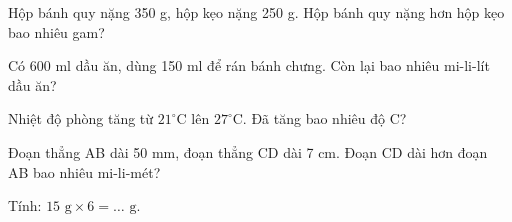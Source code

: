 \begin{ex}
Hộp bánh quy nặng 350 g, hộp kẹo nặng 250 g. Hộp bánh quy nặng hơn hộp kẹo bao nhiêu gam?
\end{ex}

\begin{ex}
Có 600 ml dầu ăn, dùng 150 ml để rán bánh chưng. Còn lại bao nhiêu mi-li-lít dầu ăn?
\end{ex}

\begin{ex}
Nhiệt độ phòng tăng từ $21^\circ$C lên $27^\circ$C. Đã tăng bao nhiêu độ C?
\end{ex}

\begin{ex}
Đoạn thẳng AB dài 50 mm, đoạn thẳng CD dài 7 cm. Đoạn CD dài hơn đoạn AB bao nhiêu mi-li-mét?
\end{ex}

\begin{ex}
Tính: $15\text{ g} \times 6 = \dots\text{ g}$.
\end{ex}
